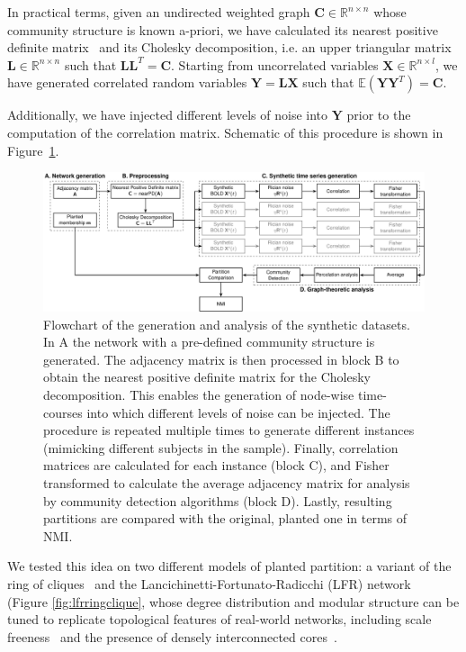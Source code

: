 In practical terms, given an undirected weighted graph  $\mathbf{C} \in \mathbb{R}^{n\times n}$ whose community structure is known a-priori, we have calculated its nearest positive definite matrix~\cite{higham1988} and its Cholesky decomposition, i.e. an upper triangular matrix $\mathbf{L}\in \mathbb{R}^{n\times n}$ such that $\mathbf{L}\mathbf{L}^T=\mathbf{C}$. Starting from uncorrelated variables $\mathbf{X} \in \mathbb{R}^{n \times l}$, we have generated correlated random variables $\mathbf{Y}=\mathbf{L} \mathbf{X}$ such that $\mathbb{E}(\mathbf{Y}\mathbf{Y}^T)=\mathbf{C}$.

Additionally, we have injected different levels of noise into $\mathbf{Y}$ prior to the computation of the correlation matrix. 
Schematic of this procedure is shown in Figure~\ref{fig:flowchart}.

\begin{figure}
\centering
\includegraphics[height=0.39\textheight]{images/flowchart.pdf}
\caption{Flowchart of the generation and analysis of the synthetic datasets. In A the network with a pre-defined community structure is generated. The adjacency matrix is then processed in block B to obtain the nearest positive definite matrix for the Cholesky decomposition. This enables the generation of node-wise time-courses into which different levels of noise can be injected. The procedure is repeated multiple times to generate different instances (mimicking different subjects in the sample). Finally, correlation matrices are calculated for each instance (block C), and Fisher transformed to calculate the average adjacency matrix for analysis by community detection algorithms (block D). Lastly, resulting partitions are compared with the original, planted one in terms of NMI.}
\label{fig:flowchart}
\end{figure}

We tested this idea on two different models of planted partition: a variant of the ring of cliques~\cite{fortunato2007} and the Lancichinetti-Fortunato-Radicchi (LFR) network~\cite{lancichinetti2008} (Figure \ref{fig:lfrringclique}, whose degree distribution and modular structure can be tuned to replicate topological features of real-world networks, including scale freeness~\cite{hagmann2008} and the presence of densely interconnected cores~\cite{vandenheuvel2011}.

